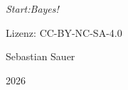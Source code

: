 \null\vfill
\begin{flushleft}
\thispagestyle{empty}
\textit{Start:Bayes!}

Lizenz: CC-BY-NC-SA-4.0

Sebastian Sauer

2026

\end{flushleft}
